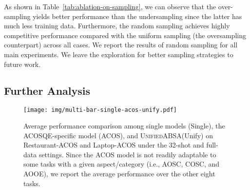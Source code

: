 \documentclass[11pt]{article}
\newcommand{\UnifiedABSA}{\textsc{UnifiedABSA}\xspace}
\begin{document}
As shown in Table~\ref{tab:ablation-on-sampling}, we can observe that the over-sampling yields better performance than the undersampling since the latter has much less training data. Furthermore, the random sampling achieves highly competitive performance compared with the uniform sampling (the oversampling counterpart) across all cases. We report the results of random sampling for all main experiments. We leave the exploration for better sampling strategies to future work.








\begin{table}[h]
\centering
\caption{The average performance comparison between different sampling strategies within a batch on Restaurant-ACOS and Laptop-ACOS under the 32-shot and full data settings. \textsc{UnifiedABSA} adopts the random sampling strategy by default.}


\label{tab:ablation-on-sampling}
\end{table} 









\subsection{Further Analysis}
\label{sec:further-analysis}

\begin{figure}[h]
\centering 
\texttt{[image: img/multi-bar-single-acos-unify.pdf]} 
\caption{Average performance comparison among single models (Single), the ACOSQE-specific model (ACOS), and \UnifiedABSA (Unify) on Restaurant-ACOS and Laptop-ACOS under the 32-shot and full-data settings. Since the ACOS model is not readily adaptable to some tasks with a given aspect/category (i.e., AOSC, COSC, and AOOE), we report the average performance over the other eight tasks.} 
\label{fig:multi-task-baseline-performance-comparison}
\end{figure}
\end{document}
